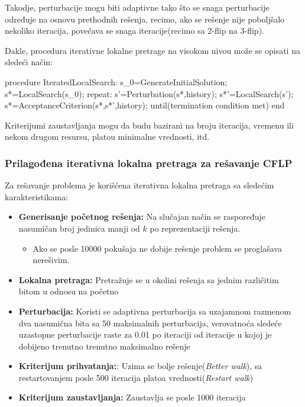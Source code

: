 \documentclass[a4paper]{article}
\begin{document}
Takodje, perturbacije mogu biti adaptivne tako što se snaga perturbacije određuje na osnovu prethodnih rešenja, recimo, ako se rešenje nije poboljšalo nekoliko iteracija, povećava se snaga iteracije(recimo sa 2-flip na 3-flip).

Dakle, procedura iterativne lokalne pretrage na visokom nivou može se opisati na sledeći način:

\begin{algorithm}
procedure IteratedLocalSearch:
	s_0=GenerateInitialSolution;
	s*=LocalSearch(s_0);
	repeat:
		s'=Perturbation(s*,history);
		s*'=LocalSearch(s');
		s*=AcceptanceCriterion(s*,s*',history);
	until(termination condition met)
end
\end{algorithm}

Kriterijumi zaustavljanja mogu da budu bazirani na broju iteracija, vremenu ili nekom drugom resursu, platou minimalne vrednosti, itd.

\subsubsection{Prilagođena iterativna lokalna pretraga za rešavanje CFLP}

Za rešavanje problema je korišćena iterativna lokalna pretraga sa sledećim karakteristikama:

\begin{itemize}
\item \textbf{Generisanje početnog rešenja:} Na slučajan način se raspoređuje nasumičan broj jedinica manji od $k$ po reprezentaciji rešenja.
	\begin{itemize}
		\item Ako se posle 10000 pokušaja ne dobije rešenje problem se proglašava nerešivim.
	\end{itemize}
\item \textbf{Lokalna pretraga:} Pretražuje se u okolini rešenja sa jednim različitim bitom u odnosu na početno
\item \textbf{Perturbacija:} Koristi se adaptivna perturbacija sa uzajamnom razmenom dva nasumična bita sa 50 maksimalnih perturbacija, verovatnoća sledeće uzastopne perturbacije raste za 0.01 po iteraciji od iteracije u kojoj je dobijeno trenutno trenutno maksimalno rešenje
\item \textbf{Kriterijum prihvatanja:}: Uzima se bolje rešenje(\emph{Better walk}), sa restartovanjem posle 500 iteracija platoa vrednosti(\emph{Restart walk})
\item \textbf{Kriterijum zaustavljanja:} Zaustavlja se posle 1000 iteracija
\end{itemize}
\end{document}
